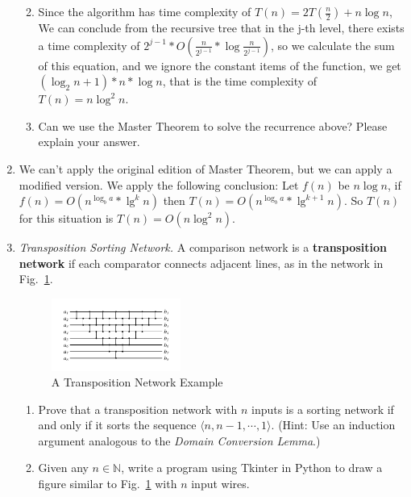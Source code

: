 \documentclass[12pt,a4paper]{article}
\makeatletter
\newtheorem*{solution}{Solution}
\theoremstyle{definition}
\renewenvironment{solution}[1][Solution] {\par\pushQED{\qed}\normalfont\topsep6\p@\@plus6\p@\relax\trivlist\item[\hskip\labelsep\bfseries#1\@addpunct{.}]\ignorespaces}{\popQED\endtrivlist\@endpefalse} \makeatother
\makeatother
\begin{document}
\begin{enumerate}
\begin{enumerate}
\begin{solution}
Since the algorithm has time complexity of $T\left(n\right)=2T\left(\frac{n}{2}\right)+n\log n$, We can conclude from the recursive tree that in the j-th level, there exists a time complexity of $2^{j-1}*O\left(\frac{n}{2^{j-1}}*\log \frac{n}{2^{j-1}}\right)$, so we calculate the sum of this equation, and we ignore the constant items of the function, we get $\left(\log_2 n +1\right)*n*\log n$, that is the time complexity of $T\left(n\right)=n\log^2 n$. 
\end{solution}


\item
Can we use the Master Theorem to solve the recurrence above? Please explain your answer.
\end{enumerate}
\begin{solution}
We can't apply the original edition of Master Theorem, but we can apply a modified version. We apply the following conclusion: Let $f(n)$ be $n \log n$, if $f(n)=O\left(n^{\log_ b a}*\lg^k n \right)$ then $T(n)=O\left(n^{\log_ b a}*\lg^{k+1} n \right)$. So $T(n)$ for this situation is $T\left(n\right)=O\left(n\log^2 n\right)$.  
\end{solution}
\item
\textit{Transposition Sorting Network.} A comparison network is a \textbf{transposition network}  if each comparator connects adjacent lines, as in the network in Fig.~\ref{Fig-Transposition}.

\begin{figure}[htbp]
    \centering
    \includegraphics[width=0.4\textwidth]{Fig-Transposition.pdf}
    \caption{A Transposition Network Example}\label{Fig-Transposition}
\end{figure}

\begin{enumerate}
\item Prove that a transposition network with $n$ inputs is a sorting network if and only if it sorts the sequence $\langle n, n-1, \cdots, 1 \rangle$. {\color{blue}(Hint: Use an induction argument analogous to the \emph{Domain Conversion Lemma}.)}
\item {\color{red}{(Optional Sub-question with Bonus)}} Given any $n \in \mathbb{N}$, write a program using Tkinter in Python to draw a figure similar to Fig.~\ref{Fig-Transposition} with $n$ input wires.
\end{enumerate}
\end{enumerate}
\end{document}
